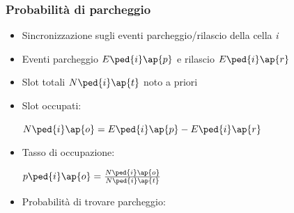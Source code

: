 \documentclass{beamer}
\begin{document}
\begin{frame}
  \frametitle{Probabilità di parcheggio}

  \begin{itemize}
    \item Sincronizzazione sugli eventi parcheggio/rilascio della cella \textit{i}
    \item Eventi parcheggio $E\ped{i}\ap{p}$ e rilascio $E\ped{i}\ap{r}$
    \item Slot totali $N\ped{i}\ap{t}$ noto a priori
    \item Slot occupati:
    \\
    {\centering $N\ped{i}\ap{o} = E\ped{i}\ap{p} - E\ped{i}\ap{r}$\par}
    \vspace{2mm}
    \item Tasso di occupazione:
    \\
    {\centering $p\ped{i}\ap{o} = \frac{N\ped{i}\ap{o}}{N\ped{i}\ap{t}}$\par}
    \vspace{2mm}
    \item Probabilità di trovare parcheggio:
    \\
    \vspace{4mm}
    \centering {}
  \end{itemize}
\end{frame}
\end{document}
